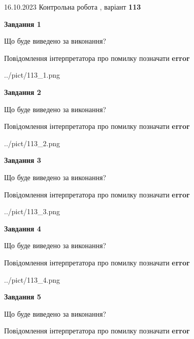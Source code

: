 \documentclass[12pt, ukrainian]{article}
\begin{document}
{\Large{16.10.2023 Контрольна робота , варіант  \No \textbf { 113 }\par}}
{
\begin {large}
{\begin {center}\textbf{Завдання 1}\end {center}}\par
Що буде виведено за виконання? \par
Повідомлення інтерпретатора про помилку позначати \textbf{error}

\begin{center}
	{../pict/113_1.png}
\end{center}
\newpage

{\begin {center}\textbf{Завдання 2}\end {center}}\par
Що буде виведено за виконання? \par
Повідомлення інтерпретатора про помилку позначати \textbf{error}

\begin{center}
	{../pict/113_2.png}
\end{center}
\newpage

{\begin {center}\textbf{Завдання 3}\end {center}}\par
Що буде виведено за виконання? \par
Повідомлення інтерпретатора про помилку позначати \textbf{error}

\begin{center}
	{../pict/113_3.png}
\end{center}
\newpage

{\begin {center}\textbf{Завдання 4}\end {center}}\par
Що буде виведено за виконання? \par
Повідомлення інтерпретатора про помилку позначати \textbf{error}

\begin{center}
	{../pict/113_4.png}
\end{center}
\newpage

{\begin {center}\textbf{Завдання 5}\end {center}}\par
Що буде виведено за виконання? \par
Повідомлення інтерпретатора про помилку позначати \textbf{error}


\end{large}}
\end{document}
